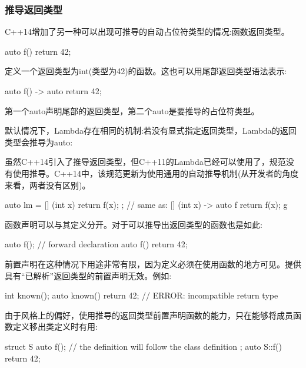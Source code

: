 \subsubsection{推导返回类型}

C++14增加了另一种可以出现可推导的自动占位符类型的情况:函数返回类型。

\begin{cpp}
auto f() { return 42; }
\end{cpp}

定义一个返回类型为int(类型为42)的函数。这也可以用尾部返回类型语法表示:

\begin{cpp}
auto f() -> auto { return 42; }
\end{cpp}

第一个auto声明尾部的返回类型，第二个auto是要推导的占位符类型。

默认情况下，Lambda存在相同的机制:若没有显式指定返回类型，Lambda的返回类型会推导为auto:

\begin{notice}虽然C++14引入了推导返回类型，但C++11的Lambda已经可以使用了，规范没有使用推导。C++14中，该规范更新为使用通用的自动推导机制(从开发者的角度来看，两者没有区别)。
\end{notice}

\begin{cpp}
auto lm = [] (int x) { return f(x); };
// same as: [] (int x) -> auto f return f(x); g
\end{cpp}

函数声明可以与其定义分开。对于可以推导出返回类型的函数也是如此:

\begin{cpp}
auto f(); // forward declaration
auto f() { return 42; }
\end{cpp}

前置声明在这种情况下用途非常有限，因为定义必须在使用函数的地方可见。提供具有“已解析”返回类型的前置声明无效。例如:

\begin{cpp}
int known();
auto known() { return 42; } // ERROR: incompatible return type
\end{cpp}

由于风格上的偏好，使用推导的返回类型前置声明函数的能力，只在能够将成员函数定义移出类定义时有用:

\begin{cpp}
struct S {
	auto f(); // the definition will follow the class definition
};
auto S::f() { return 42; }
\end{cpp}

